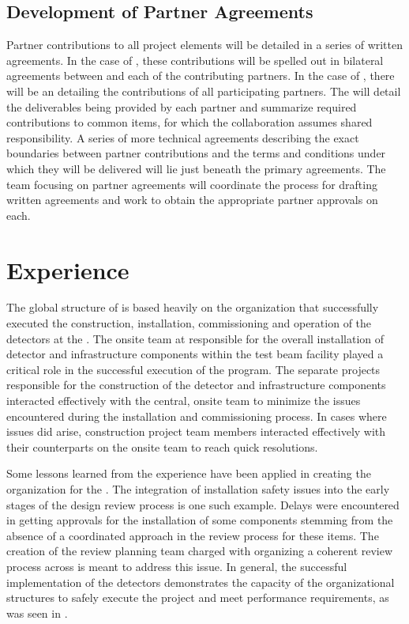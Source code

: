 \subsection{Development of Partner Agreements}
\label{sec:dune_agreements}

Partner contributions to all project elements will be detailed 
in a series of written agreements.  In the case of , 
these contributions will be spelled out in bilateral agreements 
between  and each of the contributing partners.  In 
the case of , there will be an  
detailing the contributions of all participating partners.  The 
 will detail the deliverables being provided by each 
partner and summarize required contributions to common items, 
for which the collaboration assumes shared responsibility.  
A series of more technical agreements describing the exact 
boundaries between partner contributions and the terms and 
conditions under which they will be delivered will lie just 
beneath the primary agreements.  The  team focusing 
on partner agreements will coordinate the process for drafting 
written agreements and work to obtain the appropriate partner 
approvals on each.  

\section{ Experience}
\label{sec:dune_protodune}

The global structure of  is based heavily on 
the organization that successfully executed the construction,
installation, commissioning and operation of the 
detectors at the .  The onsite team at  
responsible for the overall installation of detector and 
infrastructure components within the test beam facility played a 
critical role in the successful execution of the  
program.  The separate projects responsible for the construction 
of the detector and infrastructure components interacted effectively 
with the central, onsite team to minimize the issues encountered 
during the installation and commissioning process.  In cases where 
issues did arise, construction project team members interacted 
effectively with their counterparts on the onsite team to reach 
quick resolutions.

Some lessons learned from the  experience have 
been applied in creating the  organization for 
the  .  The integration of installation 
safety issues into the early stages of the design review process 
is one such example.  Delays were encountered in getting approvals 
for the installation of some  components stemming from 
the absence of a coordinated approach in the review process for 
these items.  The creation of the  review planning 
team charged with organizing a coherent review process across 
 is meant to address this issue.  In general, 
the successful implementation of the  detectors 
demonstrates the capacity of the organizational structures to 
safely execute the project and meet performance requirements, as 
was seen in .

